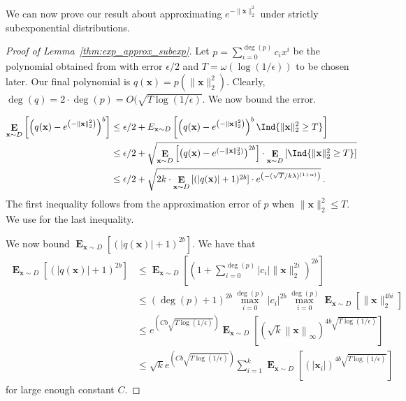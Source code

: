 \documentclass[10pt,a4paper]{article}
\newcommand\twonorm[1]{\|#1\|_2}
\newcommand\norm[1]{\left\| #1 \right\|}
\renewcommand\vec[1]{\mathbf{#1}}
\DeclareMathOperator*{\E}{\mathbf{E}}
\newcommand{\1}{\Ind}
\newcommand{\x}{\vec x}
\begin{document}
We can now prove our result about approximating $e^{-\twonorm{\x}^2}$ under strictly subexponential distributions.
\begin{proof}[Proof of Lemma~\ref{thm:exp_approx_subexp}]
\label{proof:exp_approx_subexp}
    Let $p=\sum_{i=0}^{\deg(p)}c_ix^i$ be the polynomial obtained from  with  error $\epsilon/2$ and $T=\omega(\log(1/\epsilon))$ to be chosen later. Our final polynomial is $q(\x)=p\left(\twonorm{\x}^2\right)$. Clearly, $\deg(q)=2\cdot \deg(p)=O(\sqrt{T\log(1/\epsilon)}$. We now bound the error.

    \begin{align*}
        \E_{\x\sim D}\left[ \left(q(\x)-e^{\left(-\twonorm{\x}^2\right)}\right)^b\right]&\leq \epsilon/2+E_{\x\sim D}\left[\left(q(\x)-e^{\left(-\twonorm{\x}^2\right)}\right)^b\1\{\twonorm{\x}^2\geq T\}\right]\\
        &\leq\epsilon/2+ \sqrt{\E_{\x\sim D}\left[\left(q(\x)-e^{(-\twonorm{\x}^2)}\right)^{2b}\right]\cdot  \E_{\x\sim D}\left[\1\{\twonorm{\x}^2\geq T\}\right]}\\
        &\leq \epsilon/2+ \sqrt{2k\cdot \E_{\x\sim D}\left[(|q(\x)|+1)^{2b}\right]\cdot e^{\left(-(\sqrt{T}/k\lambda)^{(1+\alpha)}\right)}} \,.
     \end{align*}
     The first inequality follows from the approximation error of $p$ when $\twonorm{\x}^2\leq T$. We use  for the last inequality.

     We now bound $\E_{\x\sim D}\left[(|q(\x)|+1)^{2b}\right]$. We have that
     \begin{align*}
        \E_{\x\sim D}[(|q(\x)|+1)^{2b}]&\leq \E_{\x\sim D}\left[\left(1+\sum_{i=0}^{\deg(p)}|c_i|\twonorm{\x}^{2i}\right)^{2b}\right]\\
        &\leq (\deg(p)+1)^{2b}\max_{i=0}^{\deg(p)}|c_i|^{2b}\max_{i=0}^{\deg(p)}\E_{\x\sim D}\left[\twonorm{\x}^{4bi}\right]\\
        &\leq e^{\left(Cb\sqrt{T\log(1/\epsilon)}\right)} \E_{\x\sim D}\left[\left(\sqrt{k}\norm{\x}_\infty\right)^{4b\sqrt{T\log(1/\epsilon)}}\right]\\
        &\leq \sqrt{k}e^{\left(Cb\sqrt{T\log(1/\epsilon)}\right)}  \sum_{i=1}^{k}\E_{\x\sim D}\left[\left(|\x_i|\right)^{4b\sqrt{T\log(1/\epsilon)}}\right]
     \end{align*} for large enough constant $C$.


\end{proof}
\end{document}
